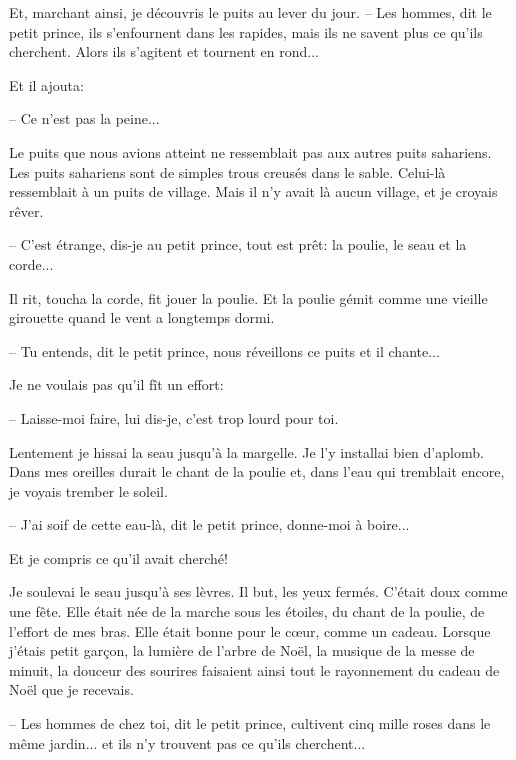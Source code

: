 \documentclass[a4paper]{report}
\begin{document}
Et, marchant ainsi, je découvris le puits au lever du jour.
\parachapter{} %
-- Les hommes, dit le petit prince, ils s'enfournent dans les rapides, mais ils ne savent plus ce qu'ils cherchent. Alors ils s'agitent et tournent en rond...

Et il ajouta:

-- Ce n'est pas la peine...

Le puits que nous avions atteint ne ressemblait pas aux autres puits sahariens. Les puits sahariens sont de simples trous creusés dans le sable. Celui-là ressemblait à un puits de village. Mais il n'y avait là aucun village, et je croyais rêver.


-- C'est étrange, dis-je au petit prince, tout est prêt: la poulie, le seau et la corde...

Il rit, toucha la corde, fit jouer la poulie. Et la poulie gémit comme une vieille girouette quand le vent a longtemps dormi.

-- Tu entends, dit le petit prince, nous réveillons ce puits et il chante...

Je ne voulais pas qu'il fît un effort:

-- Laisse-moi faire, lui dis-je, c'est trop lourd pour toi.

Lentement je hissai la seau jusqu'à la margelle. Je l'y installai bien d'aplomb. Dans mes oreilles durait le chant de la poulie et, dans l'eau qui tremblait encore, je voyais trember le soleil.

-- J'ai soif de cette eau-là, dit le petit prince, donne-moi à boire...

Et je compris ce qu'il avait cherché!

Je soulevai le seau jusqu'à ses lèvres. Il but, les yeux fermés. C'était doux comme une fête. Elle était née de la marche sous les étoiles, du chant de la poulie, de l'effort de mes bras. Elle était bonne pour le cœur, comme un cadeau. Lorsque j'étais petit garçon, la lumière de l'arbre de Noël, la musique de la messe de minuit, la douceur des sourires faisaient ainsi tout le rayonnement du cadeau de Noël que je recevais.

-- Les hommes de chez toi, dit le petit prince, cultivent cinq mille roses dans le même jardin... et ils n'y trouvent pas ce qu'ils cherchent...
\end{document}

